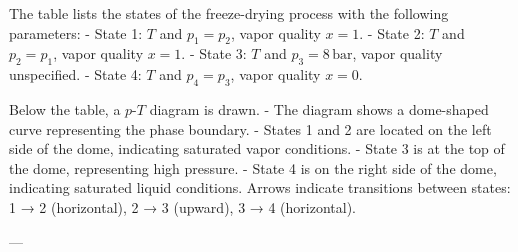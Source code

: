 The table lists the states of the freeze-drying process with the following parameters:  
- State 1: \( T \) and \( p_1 = p_2 \), vapor quality \( x = 1 \).  
- State 2: \( T \) and \( p_2 = p_1 \), vapor quality \( x = 1 \).  
- State 3: \( T \) and \( p_3 = 8 \, \text{bar} \), vapor quality unspecified.  
- State 4: \( T \) and \( p_4 = p_3 \), vapor quality \( x = 0 \).  

Below the table, a \( p \)-\( T \) diagram is drawn.  
- The diagram shows a dome-shaped curve representing the phase boundary.  
- States 1 and 2 are located on the left side of the dome, indicating saturated vapor conditions.  
- State 3 is at the top of the dome, representing high pressure.  
- State 4 is on the right side of the dome, indicating saturated liquid conditions.  
Arrows indicate transitions between states:  
1 → 2 (horizontal), 2 → 3 (upward), 3 → 4 (horizontal).

---